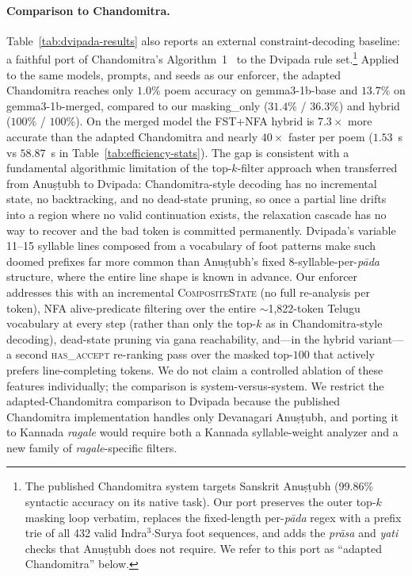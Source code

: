 \documentclass[11pt]{article}
\begin{document}
\paragraph{Comparison to Chandomitra.}
Table~\ref{tab:dvipada-results} also reports an external
constraint-decoding baseline: a faithful port of Chandomitra's
Algorithm~1~\citep{jagadeeshan2026chandomitra} to the Dvipada rule
set.\footnote{The published Chandomitra system targets Sanskrit
Anu\d{s}\d{t}ubh (99.86\% syntactic accuracy on its native task). Our
port preserves the outer top-$k$ masking loop verbatim, replaces the
fixed-length per-\textit{p\={a}da} regex with a prefix trie of all 432
valid Indra$^3$$\cdot$Surya foot sequences, and adds the
\textit{pr\={a}sa} and \textit{yati} checks that Anu\d{s}\d{t}ubh does
not require. We refer to this port as ``adapted Chandomitra'' below.}
Applied to the same models, prompts, and seeds as our enforcer, the
adapted Chandomitra reaches only $1.0\%$ poem accuracy on
gemma3-1b-base and $13.7\%$ on gemma3-1b-merged, compared to our
masking\_only ($31.4\%$ / $36.3\%$) and hybrid ($100\%$ / $100\%$). On
the merged model the FST+NFA hybrid is $7.3\times$ more accurate than
the adapted Chandomitra and nearly $40\times$ faster per poem
($1.53$~s vs $58.87$~s in Table~\ref{tab:efficiency-stats}). The gap
is consistent with a fundamental algorithmic limitation of the
top-$k$-filter approach when transferred from Anu\d{s}\d{t}ubh to
Dvipada: Chandomitra-style decoding has no incremental state, no
backtracking, and no dead-state pruning, so once a partial line drifts
into a region where no valid continuation exists, the relaxation
cascade has no way to recover and the bad token is committed
permanently. Dvipada's variable 11--15 syllable lines composed from a
vocabulary of foot patterns make such doomed prefixes far more common
than Anu\d{s}\d{t}ubh's fixed 8-syllable-per-\textit{p\={a}da}
structure, where the entire line shape is known in advance. Our
enforcer addresses this with an incremental \textsc{CompositeState}
(no full re-analysis per token), NFA alive-predicate filtering
over the entire $\sim$1{,}822-token Telugu vocabulary at every step
(rather than only the top-$k$ as in Chandomitra-style decoding),
dead-state pruning via gana reachability, and---in the hybrid
variant---a second \textsc{has\_accept} re-ranking pass over the
masked top-$100$ that actively prefers line-completing tokens. We do not claim a controlled
ablation of these features individually; the comparison is
system-versus-system. We restrict the adapted-Chandomitra comparison to
Dvipada because the published Chandomitra implementation handles only
Devanagari Anu\d{s}\d{t}ubh, and porting it to Kannada \textit{ragale}
would require both a Kannada syllable-weight analyzer and a new family
of \textit{ragale}-specific filters.
\end{document}

